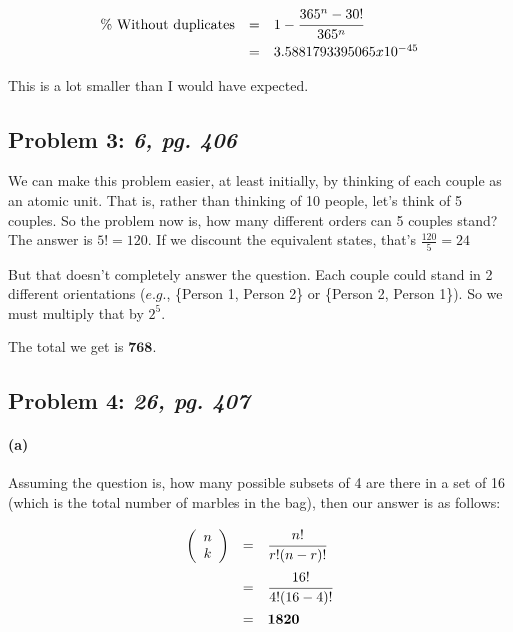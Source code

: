 \documentclass[a4paper]{article}
\begin{document}
\begin{equation}
\begin{array}{rll}
\mbox{\% Without duplicates} & = & 1- \cfrac{365^n-30!}{365^n} \\[.1in]
& = & 3.5881793395065x10^{-45}\\
\end{array}
\end{equation}

This is a lot smaller than I would have expected.

\subsection*{Problem 3: \textit{6, pg. 406}} We can make this problem easier, at least initially, by thinking of each couple as an atomic unit. That is, rather than thinking of 10 people, let's think of 5 couples. So the problem now is, how many different orders can 5 couples stand? The answer is $5! = 120$. If we discount the equivalent states, that's $\frac{120}{5} = 24$

But that doesn't completely answer the question. Each couple could stand in 2 different orientations ($\textit{e.g.}$, \{Person 1, Person 2\} or \{Person 2, Person 1\}). So we must multiply that by $2^5$.

The total we get is $\textbf{768}$.

\subsection*{Problem 4: \textit{26, pg. 407}}

\paragraph{(a)} Assuming the question is, how many possible subsets of 4 are there in a set of 16 (which is the total number of marbles in the bag), then our answer is as follows:

\begin{equation}
\begin{array}{rll}
\left ( \begin{array}{c} n \\ k \end{array} \right ) & = & \cfrac{n!}{r!(n-r)!} \\[.15in]
& = & \cfrac{16!}{4!(16-4)!} \\[.15in]
& = & \mathbf{1820} \\[.15in]
\end{array}
\end{equation}
\end{document}
